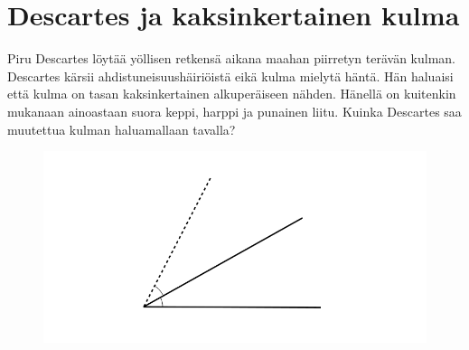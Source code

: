 \clearpage

\section{Descartes ja kaksinkertainen kulma}

Piru Descartes löytää yöllisen retkensä aikana maahan piirretyn terävän kulman. Descartes kärsii ahdistuneisuushäiriöistä eikä kulma mielytä häntä. Hän haluaisi että kulma on tasan kaksinkertainen alkuperäiseen nähden. Hänellä on kuitenkin mukanaan ainoastaan suora keppi, harppi ja punainen liitu. Kuinka Descartes saa muutettua kulman haluamallaan tavalla?

\begin{figure}[h]
    \centering
    \includegraphics[width=0.7\linewidth]{kuvat/uusi_kulma.png}
\end{figure}